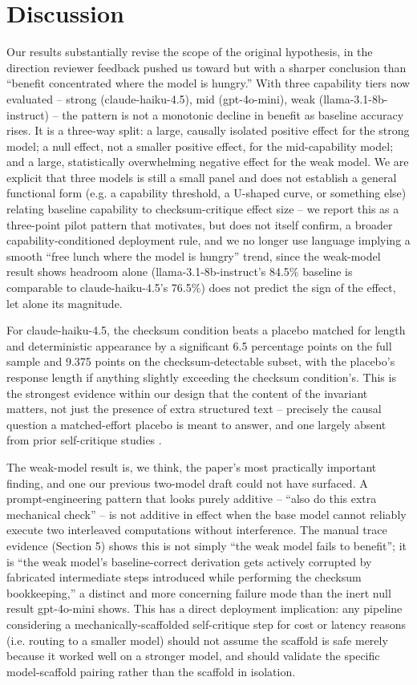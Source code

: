 \documentclass[11pt,letterpaper]{article}
\begin{document}
\section{Discussion}

Our results substantially revise the scope of the original hypothesis, in the direction reviewer feedback pushed us toward but with a sharper conclusion than ``benefit concentrated where the model is hungry.'' With three capability tiers now evaluated -- strong (claude-haiku-4.5), mid (gpt-4o-mini), weak (llama-3.1-8b-instruct) -- the pattern is not a monotonic decline in benefit as baseline accuracy rises. It is a three-way split: a large, causally isolated positive effect for the strong model; a null effect, not a smaller positive effect, for the mid-capability model; and a large, statistically overwhelming negative effect for the weak model. We are explicit that three models is still a small panel and does not establish a general functional form (e.g. a capability threshold, a U-shaped curve, or something else) relating baseline capability to checksum-critique effect size -- we report this as a three-point pilot pattern that motivates, but does not itself confirm, a broader capability-conditioned deployment rule, and we no longer use language implying a smooth ``free lunch where the model is hungry'' trend, since the weak-model result shows headroom alone (llama-3.1-8b-instruct's 84.5\% baseline is comparable to claude-haiku-4.5's 76.5\%) does not predict the sign of the effect, let alone its magnitude.

For claude-haiku-4.5, the checksum condition beats a placebo matched for length and deterministic appearance by a significant 6.5 percentage points on the full sample and 9.375 points on the checksum-detectable subset, with the placebo's response length if anything slightly exceeding the checksum condition's. This is the strongest evidence within our design that the content of the invariant matters, not just the presence of extra structured text -- precisely the causal question a matched-effort placebo is meant to answer, and one largely absent from prior self-critique studies \citep{Madaan2023,Huang2023,Kamoi2024,Stechly2024}.

The weak-model result is, we think, the paper's most practically important finding, and one our previous two-model draft could not have surfaced. A prompt-engineering pattern that looks purely additive -- ``also do this extra mechanical check'' -- is not additive in effect when the base model cannot reliably execute two interleaved computations without interference. The manual trace evidence (Section 5) shows this is not simply ``the weak model fails to benefit''; it is ``the weak model's baseline-correct derivation gets actively corrupted by fabricated intermediate steps introduced while performing the checksum bookkeeping,'' a distinct and more concerning failure mode than the inert null result gpt-4o-mini shows. This has a direct deployment implication: any pipeline considering a mechanically-scaffolded self-critique step for cost or latency reasons (i.e. routing to a smaller model) should not assume the scaffold is safe merely because it worked well on a stronger model, and should validate the specific model-scaffold pairing rather than the scaffold in isolation.
\end{document}

